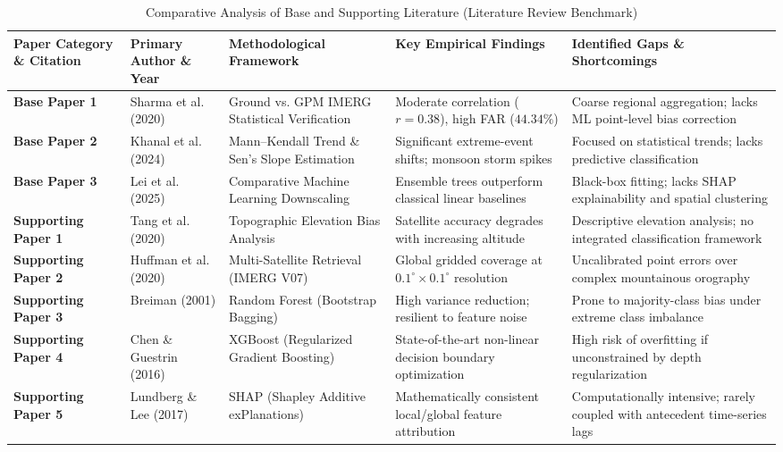 \documentclass[conference]{IEEEtran}
\begin{document}
\begin{table}[!tbp]
\centering
\caption{Comparative Analysis of Base and Supporting Literature (Literature Review Benchmark)}
\label{tab:lit_comparison}
\vspace{3pt}
{\footnotesize
\renewcommand{\arraystretch}{1.18}\setlength{\tabcolsep}{3.5pt}%
\begin{tabularx}{\textwidth}{|p{2.3cm}|p{2.3cm}|X|X|X|}
\hline
\textbf{Paper Category \& Citation} & \textbf{Primary Author \& Year} & \textbf{Methodological Framework} & \textbf{Key Empirical Findings} & \textbf{Identified Gaps \& Shortcomings} \\
\hline
\textbf{Base Paper 1} \cite{sharma2020} & Sharma et al. (2020) & Ground vs. GPM IMERG Statistical Verification & Moderate correlation ($r=0.38$), high FAR ($44.34\%$) & Coarse regional aggregation; lacks ML point-level bias correction \\ \hline
\textbf{Base Paper 2} \cite{khanal2024} & Khanal et al. (2024) & Mann--Kendall Trend \& Sen's Slope Estimation & Significant extreme-event shifts; monsoon storm spikes & Focused on statistical trends; lacks predictive classification \\ \hline
\textbf{Base Paper 3} \cite{lei2025} & Lei et al. (2025) & Comparative Machine Learning Downscaling & Ensemble trees outperform classical linear baselines & Black-box fitting; lacks SHAP explainability and spatial clustering \\ \hline
\textbf{Supporting Paper 1} \cite{Tang2020} & Tang et al. (2020) & Topographic Elevation Bias Analysis & Satellite accuracy degrades with increasing altitude & Descriptive elevation analysis; no integrated classification framework \\ \hline
\textbf{Supporting Paper 2} \cite{Huffman2020} & Huffman et al. (2020) & Multi-Satellite Retrieval (IMERG V07) & Global gridded coverage at $0.1^\circ \times 0.1^\circ$ resolution & Uncalibrated point errors over complex mountainous orography \\ \hline
\textbf{Supporting Paper 3} \cite{Breiman2001} & Breiman (2001) & Random Forest (Bootstrap Bagging) & High variance reduction; resilient to feature noise & Prone to majority-class bias under extreme class imbalance \\ \hline
\textbf{Supporting Paper 4} \cite{Chen2016} & Chen \& Guestrin (2016) & XGBoost (Regularized Gradient Boosting) & State-of-the-art non-linear decision boundary optimization & High risk of overfitting if unconstrained by depth regularization \\ \hline
\textbf{Supporting Paper 5} \cite{Lundberg2017} & Lundberg \& Lee (2017) & SHAP (Shapley Additive exPlanations) & Mathematically consistent local/global feature attribution & Computationally intensive; rarely coupled with antecedent time-series lags \\
\hline
\end{tabularx}%
}
\end{table}
\end{document}
